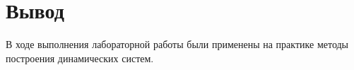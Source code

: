 \chapter{Вывод}
\label{ch:chap4}

В ходе выполнения лабораторной работы были применены на практике методы построения динамических систем.

\endinput